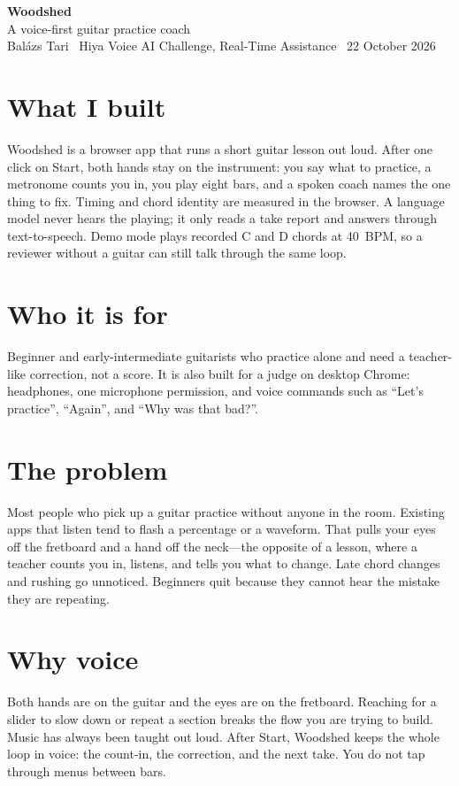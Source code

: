 \documentclass[10pt,a4paper]{article}
\begin{document}
{\LARGE\bfseries Woodshed}\\[0.2em]
{\large A voice-first guitar practice coach}\\[0.35em]
{\small Bal\'azs Tari \textperiodcentered\ Hiya Voice AI Challenge, Real-Time Assistance \textperiodcentered\ 22 October 2026}

\section{What I built}
Woodshed is a browser app that runs a short guitar lesson out loud. After one click on Start, both hands stay on the instrument: you say what to practice, a metronome counts you in, you play eight bars, and a spoken coach names the one thing to fix. Timing and chord identity are measured in the browser. A language model never hears the playing; it only reads a take report and answers through text-to-speech. Demo mode plays recorded C and D chords at 40~BPM, so a reviewer without a guitar can still talk through the same loop.

\section{Who it is for}
Beginner and early-intermediate guitarists who practice alone and need a teacher-like correction, not a score. It is also built for a judge on desktop Chrome: headphones, one microphone permission, and voice commands such as ``Let's practice'', ``Again'', and ``Why was that bad?''.

\section{The problem}
Most people who pick up a guitar practice without anyone in the room. Existing apps that listen tend to flash a percentage or a waveform. That pulls your eyes off the fretboard and a hand off the neck---the opposite of a lesson, where a teacher counts you in, listens, and tells you what to change. Late chord changes and rushing go unnoticed. Beginners quit because they cannot hear the mistake they are repeating.

\section{Why voice}
Both hands are on the guitar and the eyes are on the fretboard. Reaching for a slider to slow down or repeat a section breaks the flow you are trying to build. Music has always been taught out loud. After Start, Woodshed keeps the whole loop in voice: the count-in, the correction, and the next take. You do not tap through menus between bars.
\end{document}
